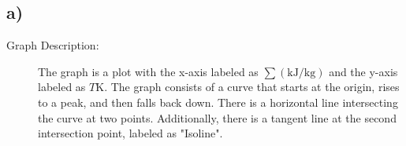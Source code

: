 

\subsection*{a)}

\begin{description}
    \item[Graph Description:] The graph is a plot with the x-axis labeled as $\sum (\text{kJ}/\text{kg})$ and the y-axis labeled as $T\text{K}$. The graph consists of a curve that starts at the origin, rises to a peak, and then falls back down. There is a horizontal line intersecting the curve at two points. Additionally, there is a tangent line at the second intersection point, labeled as "Isoline".
\end{description}